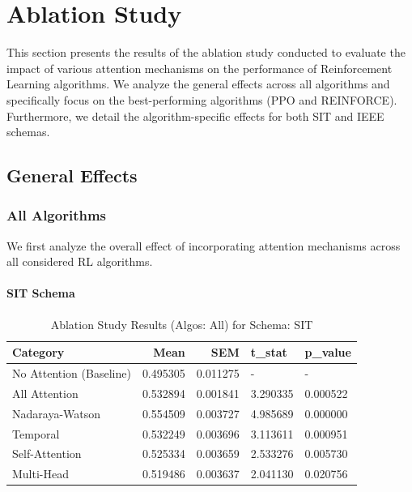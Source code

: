 \documentclass{article}
\begin{document}
\section{Ablation Study}

This section presents the results of the ablation study conducted to evaluate the impact of various attention mechanisms on the performance of Reinforcement Learning algorithms. We analyze the general effects across all algorithms and specifically focus on the best-performing algorithms (PPO and REINFORCE). Furthermore, we detail the algorithm-specific effects for both SIT and IEEE schemas.

\subsection{General Effects}

\subsubsection{All Algorithms}

We first analyze the overall effect of incorporating attention mechanisms across all considered RL algorithms.

\paragraph{SIT Schema}

\begin{table}[ht]
\centering
\caption{Ablation Study Results (Algos: All) for Schema: SIT}
\begin{tabular}{lrrll}
\toprule
Category & Mean & SEM & t\_stat & p\_value \\
\midrule
No Attention (Baseline) & 0.495305 & 0.011275 & - & - \\
All Attention & 0.532894 & 0.001841 & 3.290335 & 0.000522 \\
Nadaraya-Watson & 0.554509 & 0.003727 & 4.985689 & 0.000000 \\
Temporal & 0.532249 & 0.003696 & 3.113611 & 0.000951 \\
Self-Attention & 0.525334 & 0.003659 & 2.533276 & 0.005730 \\
Multi-Head & 0.519486 & 0.003637 & 2.041130 & 0.020756 \\
\bottomrule
\end{tabular}
\end{table}
\end{document}
